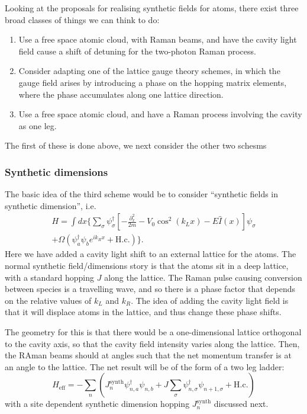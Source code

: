 \documentclass[twocolumn]{revtex4-1}
\begin{document}
Looking at the proposals for realising synthetic fields for atoms, there
exist three broad classes of things we can think to do:
\begin{enumerate}
\item Use a free space atomic cloud, with Raman beams, and have the
  cavity light field cause a shift of detuning for the two-photon
  Raman process.
\item Consider adapting one of the lattice gauge theory schemes, in
  which the gauge field arises by introducing a phase on the hopping
  matrix elements, where the phase accumulates along one lattice
  direction.
\item Use a free space atomic cloud, and have a Raman process involving
  the cavity as one leg.
\end{enumerate}
The first of these is done above, we next consider the other two schesms


\subsubsection{Synthetic dimensions}
\label{sec:synthetic-dimensions}



The basic idea of the third scheme would be to consider ``synthetic
fields in synthetic dimension'', i.e.
\begin{multline}
  H = \int dx \biggl\{\sum_\sigma
  \psi^\dagger_\sigma \left[
    - \frac{\partial_x^2}{2m}
    - V_0 \cos^2(k_L x)
    - E \hat{I}(x) 
  \right] \psi^{}_\sigma
  \\
  + \Omega \left(\psi^\dagger_a \psi^{}_b e^{i k_R x} + \text{H.c.} \right)
  \biggr\}.
\end{multline}
Here we have added a cavity light shift to an external lattice for the
atoms.  The normal synthetic field/dimensions story is that the atoms
sit in a deep lattice, with a standard hopping $J$ along the lattice.
The Raman pulse causing conversion between species is a travelling
wave, and so there is a phase factor that depends on the relative
values of $k_L$ and $k_R$.  The idea of adding the cavity light field
is that it will displace atoms in the lattice, and thus change these
phase shifts.

The geometry for this is that there would be a one-dimensional lattice
orthogonal to the cavity axis, so that the cavity field intensity
varies along the lattice.  Then, the RAman beams should at angles such
that the net momentum transfer is at an angle to the lattice. The
net result will be of the form of a two leg ladder:
\begin{displaymath}
  H_{\text{eff}} = 
  -\sum_n \left( 
    J^{\text{synth}}_n \psi^\dagger_{n,a} \psi^{}_{n,b} 
    +
    J\sum_\sigma \psi^\dagger_{n,\sigma} \psi^{}_{n+1,\sigma}
    + \text{H.c.} \right)
\end{displaymath}
with a site dependent synthetic dimension hopping $J^{\text{synth}}_n$
discussed next.
\end{document}
